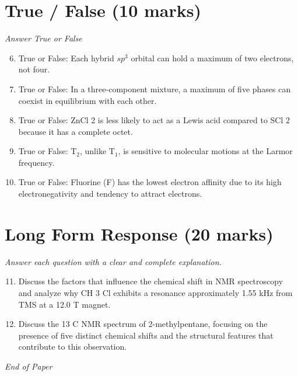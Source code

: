\documentclass[12pt]{article}
\begin{document}
\section*{True / False (10 marks)}
\textit{Answer True or False}
\begin{enumerate}[label=\arabic*.]
\setcounter{enumi}{5}
\item True or False: Each hybrid $sp^3$ orbital can hold a maximum of two electrons, not four.
\item True or False: In a three-component mixture, a maximum of five phases can coexist in equilibrium with each other.
\item True or False: ZnCl 2 is less likely to act as a Lewis acid compared to SCl 2 because it has a complete octet.
\item True or False: T$_{2}$, unlike T$_{1}$, is sensitive to molecular motions at the Larmor frequency.
\item True or False: Fluorine (F) has the lowest electron affinity due to its high electronegativity and tendency to attract electrons.
\end{enumerate}

\section*{Long Form Response (20 marks)}
\textit{Answer each question with a clear and complete explanation.}
\begin{enumerate}[label=\arabic*.]
\setcounter{enumi}{10}
\item Discuss the factors that influence the chemical shift in NMR spectroscopy and analyze why CH 3 Cl exhibits a resonance approximately 1.55 kHz from TMS at a 12.0 T magnet.
\item Discuss the 13 C NMR spectrum of 2-methylpentane, focusing on the presence of five distinct chemical shifts and the structural features that contribute to this observation.
\end{enumerate}

\vfill
\noindent\textit{End of Paper}
\end{document}
